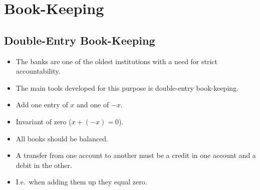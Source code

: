 \mode*




\section{Book-Keeping}

\subsection{Double-Entry Book-Keeping}

\begin{frame}
  \begin{itemize}
    \item The banks are one of the oldest institutions with a need for strict 
      accountability.

    \item The main tools developed for this purpose is double-entry 
      book-keeping.
  \end{itemize}
\end{frame}

\begin{frame}
  \begin{definition}
    \begin{itemize}
      \item Add one entry of \(x\) and one of \(-x\).
      \item Invariant of zero (\(x+(-x) = 0\)).
    \end{itemize}
  \end{definition}

  \begin{example}
    \begin{itemize}
      \item All books should be balanced.

      \item A transfer from one account to another must be a credit in one 
        account and a debit in the other.

      \item I.e.\ when adding them up they equal zero.
    \end{itemize}
  \end{example}
\end{frame}

